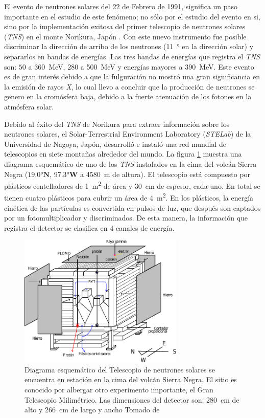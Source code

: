 El evento de neutrones solares del \num{22} de Febrero de \num{1991}, significa un paso importante en el estudio de este fenómeno; no sólo por el estudio del evento en si, sino por la implementación exitosa del primer telescopio de neutrones solares (\emph{TNS}) en el monte Norikura, Japón \cite{muraki92}. Con este nuevo instrumento fue posible discriminar la dirección de arribo de los neutrones (\SI{11}{\degree} en la dirección solar) y separarlos en bandas de energías. Las tres bandas de energías que registra el \emph{TNS} son: $50$ a \SI{360}{\mega\electronvolt}, $280$ a \SI{500}{\mega\electronvolt} y energías mayores a \SI{390}{\mega\electronvolt}. Este evento es de gran interés debido a que la fulguración no mostró una gran significancia en la emisión de rayos \emph{X}, lo cual llevo a concluir que la producción de neutrones se genero en la cromósfera baja, debido a la fuerte atenuación de los fotones en la atmósfera solar.

Debido al éxito del \emph{TNS} de Norikura para extraer información sobre los neutrones solares, el Solar-Terrestrial Environment Laboratory (\emph{STELab}) de la Universidad de Nagoya, Japón, desarrolló e instaló una red mundial de telescopios en siete montañas alrededor del mundo. La figura \ref{fig:tns-mexico} muestra una diagrama esquemático de uno de los \emph{TNS} instalados en la cima del volcán Sierra Negra ($\ang{19.0}\mathbf{N}$, $\ang{97.3}\mathbf{W}$ a \SI{4580}{\metre} de altura). El telescopio está compuesto por plásticos centelladores de \SI{1}{\square\metre} de área y \SI{30}{\centi\metre} de espesor, cada uno. En total se tienen cuatro plásticos para cubrir un área de \SI{4}{\square\metre}. En los plásticos, la energía cinética de las partículas es convertida en pulsos de luz, que después son captados por un fotomultiplicador y discriminados. De esta manera, la información que registra el detector se clasifica en \num{4} canales de energía\cite{valdes04}.

\begin{figure}
        \centering
        \includegraphics[width=0.7\textwidth]{tns-mexico.pdf}
        \caption{Diagrama esquemático del Telescopio de neutrones solares se encuentra en estación en la cima del volcán Sierra Negra. El sitio es conocido por albergar otro experimento importante, el Gran Telescopio Milimétrico. Las dimensiones del detector son: \SI{280}{\centi\metre} de alto y \SI{266}{\centi\metre} de largo y ancho Tomado de \cite{barrantes18}}
        \label{fig:tns-mexico}
\end{figure}

